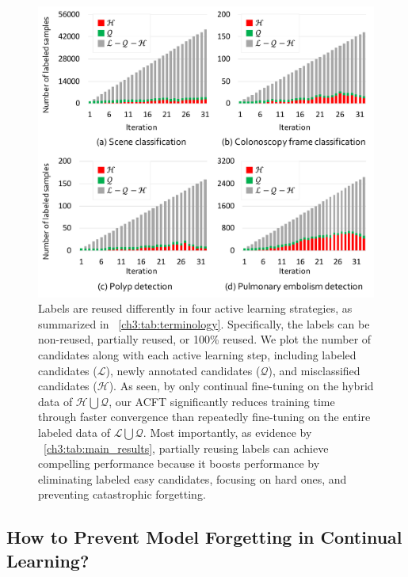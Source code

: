 \begin{figure}[t]
\begin{center}
\includegraphics[width=0.75\linewidth]{Figures/CH3/fig_label_reuse.pdf}
\end{center}
\caption[Label Reusing in Active, Continual Fine-tuning]{
Labels are reused differently in four active learning strategies, as summarized in \tableautorefname~\ref{ch3:tab:terminology}. Specifically, the labels can be non-reused, partially reused, or 100\% reused. We plot the number of candidates along with each active learning step, including labeled candidates ($\mathcal{L}$), newly annotated candidates ($\mathcal{Q}$), and misclassified candidates ($\mathcal{H}$). As seen, by only continual fine-tuning on the hybrid data of $\mathcal{H}\bigcup\mathcal{Q}$, our ACFT significantly reduces training time through faster convergence than repeatedly fine-tuning on the entire labeled data of $\mathcal{L}\bigcup\mathcal{Q}$. Most importantly, as evidence by \tableautorefname~\ref{ch3:tab:main_results}, partially reusing labels can achieve compelling performance because it boosts performance by eliminating labeled easy candidates, focusing on hard ones, and preventing catastrophic forgetting.
}
\label{ch3:fig:label_reuse}
\end{figure}

\subsection{How to Prevent Model Forgetting in Continual Learning?}
\label{ch3:discussion_conclusion:prevent_model_forgetting_continual_learning}

